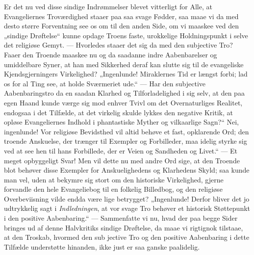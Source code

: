 \documentclass[12pt,a4paper]{book}
\begin{document}
Er det nu ved disse sindige Indrømmelser blevet vitterligt
for Alle, at Evangeliernes Troværdighed staaer paa saa svage Fødder, saa maae vi da med
desto større Forventning see os om til den anden Side, om vi maaskee ved den „sindige
Drøftelse“ kunne opdage Troens faste, urokkelige Holdningspunkt i selve det religiøse
Gemyt. --- Hvorledes staaer det sig da med den subjective Tro? Faaer den Troende maaskee
nu og da saadanne indre Aabenbarelser og umiddelbare Syner, at han med Sikkerhed deraf
kan slutte sig til de evangeliske Kjendsgjerningers Virkelighed? „Ingenlunde!
Miraklernes Tid er længst forbi; lad os for al Ting see, at holde Sværmeriet ude.“ ---
Har den subjective Aabenbaringstro da en saadan Klarhed og Tilforladelighed i sig selv,
at den paa egen Haand kunde værge sig mod enhver Tvivl om det Overnaturliges Realitet,
endogsaa i det Tilfælde, at det virkelig skulde lykkes den negative Kritik, at opløse
Evangeliernes Indhold i phantastiske Myther og vilkaarlige Sagn?“ Nei, ingenlunde! Vor
religiøse Bevidsthed vil altid behøve et fast, opklarende Ord; den troende Anskuelse,
der trænger til Exempler og Forbilleder, maa idelig styrke sig ved at see hen til hans
Forbillede, der er Veien og Sandheden og Livet.“ --- Et meget opbyggeligt Svar! Men vil
dette nu med andre Ord sige, at den Troende blot behøver disse Exempler for
Anskuelighedens og Klarhedens Skyld; saa kunde man vel, uden at bekymre sig stort om den
historiske Virkelighed, gjerne forvandle den hele Evangeliebog til en folkelig
Billedbog, og den religiøse Overbeviisning vilde endda være lige betrygget? „Ingenlunde!
Derfor bliver det jo udtrykkelig sagt i \emph{Indledningen}, at vor svage Tro behøver et
historisk Støttepunkt i den positive Aabenbaring.“ --- Sammenfatte vi nu, hvad der paa
begge Sider bringes ud af denne Halvkritiks sindige Drøftelse, da maae vi rigtignok
tilstaae, at den Troskab, hvormed den sub\-%
jective Tro og den positive Aabenbaring i dette Tilfælde understøtte hinanden, ikke
just er saa ganske paalidelig.
\end{document}

